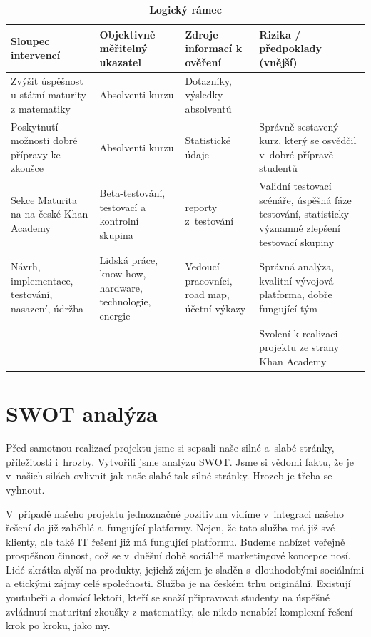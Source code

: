 \documentclass[12pt, a4paper]{report}
\begin{document}
\begin{table}[htbp]
\caption{\textbf{Logický rámec}}
\centering
\footnotesize
\begin{tabularx}{\textwidth}{|X|X|X|X|}
\hline
Sloupec intervencí & Objektivně měřitelný ukazatel & Zdroje informací k ověření & Rizika / předpoklady (vnější)\\
\hline
Zvýšit úspěšnost u státní maturity z matematiky & Absolventi kurzu & Dotazníky, výsledky absolventů & \\
\hline
Poskytnutí možnosti dobré přípravy ke zkoušce & Absolventi kurzu & Statistické údaje & Správně sestavený kurz, který se osvědčil v dobré přípravě studentů\\
\hline
Sekce Maturita na na české Khan Academy & Beta-testování, testovací a  kontrolní skupina & reporty z testování & Validní testovací scénáře, úspěšná fáze testování, statisticky významné zlepšení testovací skupiny\\
\hline
Návrh, implementace, testování, nasazení, údržba & Lidská práce, know-how, hardware, technologie, energie & Vedoucí pracovníci, road map, účetní výkazy & Správná analýza, kvalitní vývojová platforma, dobře fungující tým\\
\hline
 &  &  & Svolení k realizaci projektu ze strany Khan Academy\\
\hline
\end{tabularx}
\end{table}

\chapter{SWOT analýza}
\label{sec:org8bbf97d}
Před samotnou realizací projektu jsme si sepsali naše silné a slabé stránky,
příležitosti i hrozby. Vytvořili jsme analýzu SWOT. Jsme si vědomi faktu, že je
v našich silách ovlivnit jak naše slabé tak silné stránky. Hrozeb je třeba se
vyhnout.

V případě našeho projektu jednoznačné pozitivum vidíme v integraci našeho řešení
do již zaběhlé a fungující platformy. Nejen, že tato služba má již své klienty,
ale také IT řešení již má fungující platformu. Budeme nabízet veřejně prospěšnou
činnost, což se v dněšní době sociálně marketingové koncepce nosí. Lidé zkrátka
slyší na produkty, jejichž zájem je sladěn s dlouho\-dobými sociálními a
etickými zájmy celé společnosti. Služba je na českém trhu originální. Existují
youtubeři a domácí lektoři, kteří se snaží připravovat studenty na úspěšné
zvládnutí maturitní zkoušky z matematiky, ale nikdo nenabízí komplexní řešení
krok po kroku, jako my.
\end{document}
